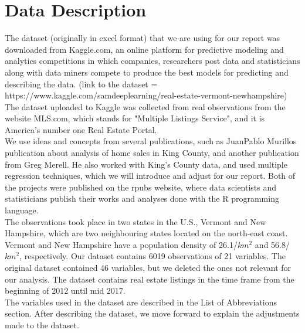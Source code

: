 \section{Data Description}\label{sec: description}
The dataset (originally in excel format) that we are using for our report was downloaded from Kaggle.com, an online platform for predictive modeling and analytics  competitions in which companies, researchers post data and statisticians along with data miners compete to produce the best models for predicting and describing the data. (link to the dataset = https://www.kaggle.com/samdeeplearning/real-estate-vermont-newhampshire) \\

The dataset uploaded to Kaggle was collected from real observations  from the website MLS.com, which stands for "Multiple Listings Service", and it is America's number one Real Estate Portal.\\

We use ideas and concepts from several publications, such as JuanPablo Murillos publication about analysis of home sales in King County, and another publication from Greg Merell. He also worked with King's County data, and used multiple regression techniques, which we will introduce and adjust for our report. Both of the projects were published on the rpubs website, where data scientists and statisticians publish their works and analyses done with the R programming language.\\

The observations took place in two states in the U.S., Vermont and New Hampshire, which are two neighbouring states located on the north-east coast. Vermont and New Hampshire have a population density of 26.1/$km^2$ and 56.8/$km^2$, respectively. Our dataset contains 6019 observations of 21 variables. The original dataset contained 46 variables, but we deleted the ones not relevant for our analysis. The dataset contains real estate listings in the time frame from the beginning of 2012 until mid 2017. \\

The variables used in the dataset are described in the List of Abbreviations section.  
After describing the dataset, we move forward to explain the adjustments made to the dataset.\\

